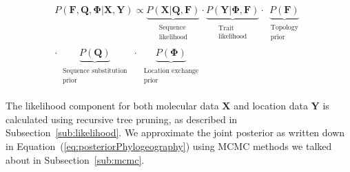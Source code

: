 \begin{eqnarray}
P\left(\mathbf{F}, \mathbf{Q}, \mathbf{\Phi}|\mathbf{X},\mathbf{Y}\right)\propto 
\underbrace{P(\mathbf{X}|\mathbf{Q}, \mathbf{F})}_{\begin{array}{c}
\substack{\text{Sequence} \\ \text{likelihood}}
\end{array}}\cdot\underbrace{P(\mathbf{Y}|\mathbf{\Phi}, \mathbf{F})}_{\begin{array}{c}
\substack{\text{Trait} \\ \text{likelihood}}
\end{array}}\cdot
\underbrace{P(\mathbf{F})}_{\begin{array}{c}
\substack{\text{Topology} \\ \text{prior}}
\end{array}} \\ \nonumber
\cdot\underbrace{P(\mathbf{Q})}_{\begin{array}{c}
\substack{\text{Sequence substitution} \\ \text{prior}}
\end{array}}\cdot\underbrace{P(\mathbf{\Phi})}_{\begin{array}{c}
\substack{\text{Location exchange} \\ \text{prior}}
\end{array}}
\label{eq:posteriorPhylogeography}
\end{eqnarray}

The likelihood component for both molecular data $\mathbf{X}$ and location data $\mathbf{Y}$ is calculated using recursive tree pruning, as described in Subsection~\ref{sub:likelihood}.
We approximate the joint posterior as written down in Equation~(\ref{eq:posteriorPhylogeography}) using MCMC methods we talked about in Subsection~\ref{sub:mcmc}.
